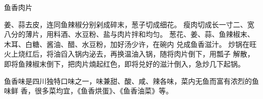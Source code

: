 \begin{recipe}{鱼香肉片}

\ingredients


\cooking

\step 姜、蒜去皮，连同鱼辣椒分别剁成碎末，葱子切成细花。
\step 瘦肉切成长一寸二、宽八分的薄片，用料酒、水豆粉、盐与肉片拌和均匀。
\step 葱花、姜、蒜、鱼辣椒末、木耳、白糖、酱油、醋、水豆粉，加好汤少许，在碗内
兑成鱼香滋汁。
\step 炒锅在旺火上烧红后，将油舀入锅内泌去，再换温油入锅，随将肉片倒下，用瓢子
解散，即将鱼辣椒末倒下，把肉片煵起红色，即将兑好的滋汁倒入，急炒几下起锅。

\notes

鱼香味是四川独特口味之一，味兼甜、酸、咸、辣各味，菜内无鱼而富有浓烈的鱼味鲜
香，很多菜均宜，《鱼香烘蛋》、《鱼香油菜》等。

\end{recipe}

